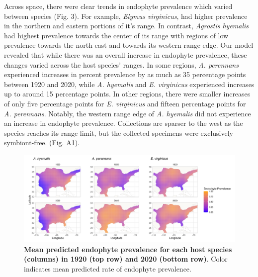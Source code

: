 \documentclass[11pt]{article}
\begin{document}
Across space, there were clear trends in endophyte prevalence which varied between species (Fig. 3). 
For example, \emph{Elymus virginicus}, had higher prevalence in the northern and eastern portions of it's range. 
In contrast, \emph{Agrostis hyemalis} had highest prevalence towards the center of its range with regions of low prevalence towards the north east and towards its western range edge.
Our model revealed that while there was an overall increase in endophyte prevalence, these changes varied across the host species' ranges.
In some regions, \emph{A. perennans} experienced increases in percent prevalence by as much as 35 percentage points between 1920 and 2020, while \emph{A. hyemalis} and \emph{E. virginicus} experienced increases up to around 15 percentage points. 
In other regions, there were smaller increases of only five percentage points for \emph{E. virginicus} and fifteen percentage points for \emph{A. perennans}. 
Notably, the western range edge of \emph{A. hyemalis} did not experience an increase in endophyte prevalence. 
Collections are sparser to the west as the species reaches its range limit, but the collected specimens were exclusively symbiont-free. (Fig. A1). 

\begin{figure}[H]
	\label{fig:prevalence_map}
	\centering
	\includegraphics[width = \linewidth]{prevalence_map.png}
	\caption{\textbf{Mean predicted endophyte prevalence for each host species (columns) in 1920 (top row) and 2020 (bottom row)}. Color indicates mean predicted rate of endophyte prevalence.}
\end{figure}
\end{document}
